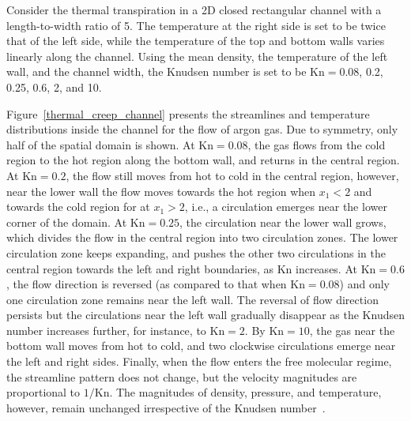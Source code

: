 Consider the thermal transpiration in a 2D closed rectangular channel with a length-to-width ratio of 5. The temperature at the right side is set to be twice that of the left side, while the temperature of the top and bottom walls varies linearly along the channel. Using the mean density, the temperature of the left wall, and the channel width, the Knudsen number is set to be $\text{Kn}=0.08$, 0.2, 0.25, 0.6, 2, and 10. 

Figure~\ref{thermal_creep_channel} presents the  streamlines and temperature distributions inside the channel for the flow of argon gas. Due to symmetry, only half of the spatial domain is shown. At $\text{Kn}=0.08$, the gas flows from the cold region to the hot region along the bottom wall, and returns in the central region. At $\text{Kn}=0.2$, the flow still moves from hot to cold in the central region, however, near the lower wall the flow moves towards the hot region when $x_1<2$ and towards the cold region for at $x_1>2$, i.e., a circulation emerges near the lower corner of the domain. At $\text{Kn}=0.25$, the circulation near the lower wall grows, which divides the flow in the central region into two circulation zones. The lower circulation zone keeps expanding, and pushes the other two circulations in the central region towards the left and right boundaries, as $\text{Kn}$ increases. At $\text{Kn}=0.6$, the flow direction is reversed (as compared to that when $\text{Kn}=0.08$) and only one circulation zone remains near the left wall. The reversal of flow direction persists but the circulations near the left wall gradually disappear as the Knudsen number increases further, for instance, to $\text{Kn}=2$. By $\text{Kn}=10$, the gas near the bottom wall moves from hot to cold, and two clockwise circulations emerge near the left and right sides. Finally, when the flow enters the free molecular regime, the streamline pattern does not change, but the velocity magnitudes are proportional to $1/\text{Kn}$. The magnitudes of density, pressure, and temperature, however, remain unchanged irrespective of the Knudsen number~\cite{lei_Jfm}.


